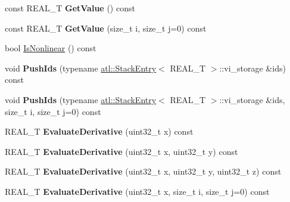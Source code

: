 \begin{DoxyCompactItemize}
\item 
\hypertarget{structatl_1_1_variable_a75e72fa736f11f18a328fd18172c6071}{const R\+E\+A\+L\+\_\+\+T {\bfseries Get\+Value} () const }\label{structatl_1_1_variable_a75e72fa736f11f18a328fd18172c6071}

\item 
\hypertarget{structatl_1_1_variable_a4e4c6c390e81522d7862fe5b9b803a1e}{const R\+E\+A\+L\+\_\+\+T {\bfseries Get\+Value} (size\+\_\+t i, size\+\_\+t j=0) const }\label{structatl_1_1_variable_a4e4c6c390e81522d7862fe5b9b803a1e}

\item 
bool \hyperlink{structatl_1_1_variable_af043141beb92eff684c7cd28618f362c}{Is\+Nonlinear} () const 
\item 
\hypertarget{structatl_1_1_variable_a0060cd8c8081cb4e5c2a3a9967e10737}{void {\bfseries Push\+Ids} (typename \hyperlink{structatl_1_1_stack_entry}{atl\+::\+Stack\+Entry}$<$ R\+E\+A\+L\+\_\+\+T $>$\+::vi\+\_\+storage \&ids) const }\label{structatl_1_1_variable_a0060cd8c8081cb4e5c2a3a9967e10737}

\item 
\hypertarget{structatl_1_1_variable_aa2ab761e1449b8efcb3b86991a9dc764}{void {\bfseries Push\+Ids} (typename \hyperlink{structatl_1_1_stack_entry}{atl\+::\+Stack\+Entry}$<$ R\+E\+A\+L\+\_\+\+T $>$\+::vi\+\_\+storage \&ids, size\+\_\+t i, size\+\_\+t j=0) const }\label{structatl_1_1_variable_aa2ab761e1449b8efcb3b86991a9dc764}

\item 
\hypertarget{structatl_1_1_variable_a366f95a9d1f2b2140f1f90032301d263}{R\+E\+A\+L\+\_\+\+T {\bfseries Evaluate\+Derivative} (uint32\+\_\+t x) const }\label{structatl_1_1_variable_a366f95a9d1f2b2140f1f90032301d263}

\item 
\hypertarget{structatl_1_1_variable_a3bc7db32a25fe488e1390d81725d6d67}{R\+E\+A\+L\+\_\+\+T {\bfseries Evaluate\+Derivative} (uint32\+\_\+t x, uint32\+\_\+t y) const }\label{structatl_1_1_variable_a3bc7db32a25fe488e1390d81725d6d67}

\item 
\hypertarget{structatl_1_1_variable_a2d32c28f89eebef1d11430548e15fb60}{R\+E\+A\+L\+\_\+\+T {\bfseries Evaluate\+Derivative} (uint32\+\_\+t x, uint32\+\_\+t y, uint32\+\_\+t z) const }\label{structatl_1_1_variable_a2d32c28f89eebef1d11430548e15fb60}

\item 
\hypertarget{structatl_1_1_variable_ad222f1a0b1655d9a82ba2ce51fa2009f}{R\+E\+A\+L\+\_\+\+T {\bfseries Evaluate\+Derivative} (uint32\+\_\+t x, size\+\_\+t i, size\+\_\+t j=0) const }\label{structatl_1_1_variable_ad222f1a0b1655d9a82ba2ce51fa2009f}


\end{DoxyCompactItemize}
